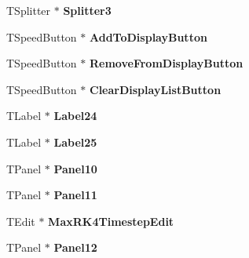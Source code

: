 \begin{DoxyCompactItemize}
\item 
\hypertarget{class_t_run_dynamic_clamp_form_a509648823ff62870fcb39ccdabcdc003}{T\+Splitter $\ast$ {\bfseries Splitter3}}\label{class_t_run_dynamic_clamp_form_a509648823ff62870fcb39ccdabcdc003}

\item 
\hypertarget{class_t_run_dynamic_clamp_form_a61b1b1fcf12637f7f4fdd068d16652d5}{T\+Speed\+Button $\ast$ {\bfseries Add\+To\+Display\+Button}}\label{class_t_run_dynamic_clamp_form_a61b1b1fcf12637f7f4fdd068d16652d5}

\item 
\hypertarget{class_t_run_dynamic_clamp_form_a6138a87711c936ce5ea9da9a6d00656b}{T\+Speed\+Button $\ast$ {\bfseries Remove\+From\+Display\+Button}}\label{class_t_run_dynamic_clamp_form_a6138a87711c936ce5ea9da9a6d00656b}

\item 
\hypertarget{class_t_run_dynamic_clamp_form_aa68a3e168d115da1ea8d01018a16cce1}{T\+Speed\+Button $\ast$ {\bfseries Clear\+Display\+List\+Button}}\label{class_t_run_dynamic_clamp_form_aa68a3e168d115da1ea8d01018a16cce1}

\item 
\hypertarget{class_t_run_dynamic_clamp_form_af97595934464e5b3b331a6abf877cd63}{T\+Label $\ast$ {\bfseries Label24}}\label{class_t_run_dynamic_clamp_form_af97595934464e5b3b331a6abf877cd63}

\item 
\hypertarget{class_t_run_dynamic_clamp_form_a7e3334e55bec4b3e70b1fc101e5b29f0}{T\+Label $\ast$ {\bfseries Label25}}\label{class_t_run_dynamic_clamp_form_a7e3334e55bec4b3e70b1fc101e5b29f0}

\item 
\hypertarget{class_t_run_dynamic_clamp_form_a450ff4b49d421cf22b2b2d587ce90b53}{T\+Panel $\ast$ {\bfseries Panel10}}\label{class_t_run_dynamic_clamp_form_a450ff4b49d421cf22b2b2d587ce90b53}

\item 
\hypertarget{class_t_run_dynamic_clamp_form_af9bf195e7849f77f45c50c0d2b72b071}{T\+Panel $\ast$ {\bfseries Panel11}}\label{class_t_run_dynamic_clamp_form_af9bf195e7849f77f45c50c0d2b72b071}

\item 
\hypertarget{class_t_run_dynamic_clamp_form_aea28c0fe6aa16224297686b18635f7a3}{T\+Edit $\ast$ {\bfseries Max\+R\+K4\+Timestep\+Edit}}\label{class_t_run_dynamic_clamp_form_aea28c0fe6aa16224297686b18635f7a3}

\item 
\hypertarget{class_t_run_dynamic_clamp_form_a37702f191e3470a0fd82cddc0d4f62ab}{T\+Panel $\ast$ {\bfseries Panel12}}\label{class_t_run_dynamic_clamp_form_a37702f191e3470a0fd82cddc0d4f62ab}


\end{DoxyCompactItemize}
